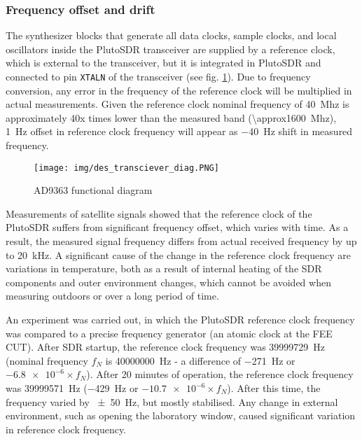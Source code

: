 \subsubsection{Frequency offset and drift}
\label{s_des_offset_drift}
The synthesizer blocks that generate all data clocks, sample clocks, and local oscillators inside the PlutoSDR transceiver are supplied by a reference clock, which is external to the transceiver, but it is integrated in PlutoSDR and connected to pin \texttt{XTALN} of the transceiver (see fig. \ref{f_des_transciever_diag})\cite{des07}. Due to frequency conversion, any error in the frequency of the reference clock will be multiplied in actual measurements. Given the reference clock nominal frequency of \qty{40}{Mhz} is approximately 40x times lower than the measured band (\qty{\approx1600}{Mhz}), \qty{1}{Hz} offset in reference clock frequency will appear as \qty{-40}{Hz} shift in measured frequency.

\begin{figure}
    \centering
    \texttt{[image: img/des\_transciever\_diag.PNG]}
    \caption{AD9363 functional diagram\cite{des07}}
    \label{f_des_transciever_diag}
\end{figure}

Measurements of satellite signals showed that the reference clock of the PlutoSDR suffers from significant frequency offset, which varies with time. As a result, the measured signal frequency differs from actual received frequency by up to \qty{20}{kHz}. A significant cause of the change in the reference clock frequency are variations in temperature, both as a result of internal heating of the SDR components and outer environment changes, which cannot be avoided when measuring outdoors or over a long period of time.

An experiment was carried out, in which the PlutoSDR reference clock frequency was compared to a precise frequency generator (an atomic clock at the FEE CUT). After SDR startup, the reference clock frequency was \qty{39999729}{Hz} (nominal frequency  $f_N$ is \qty{40000000}{Hz} - a difference of \qty{-271}{Hz} or $\num{-6.8e-6} \times f_N$). After 20 minutes of operation, the reference clock frequency was  \qty{39999571}{Hz} (\qty{-429}{Hz} or $\num{-10.7e-6} \times f_N$). After this time, the frequency varied by \qty{\pm 50}{Hz}, but mostly stabilised. Any change in external environment, such as opening the laboratory window, caused significant variation in reference clock frequency.

